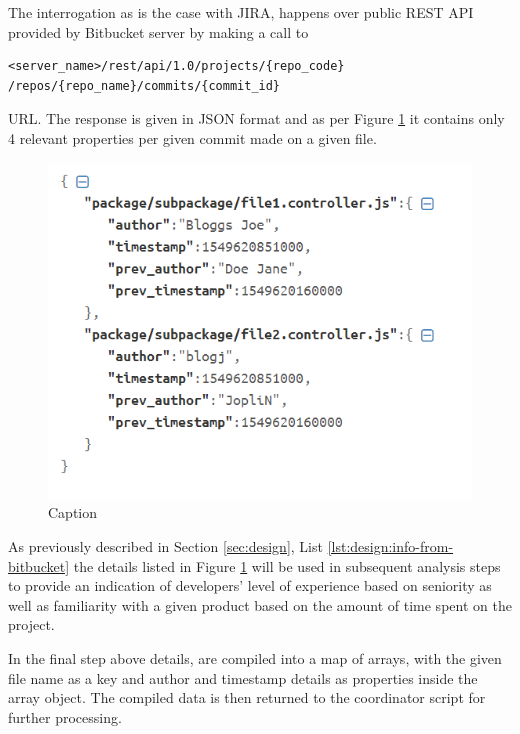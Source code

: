 The interrogation as is the case with JIRA, happens over public REST API provided by Bitbucket server by making a call to 
\begin{verbatim}
<server_name>/rest/api/1.0/projects/{repo_code} /repos/{repo_name}/commits/{commit_id}
\end{verbatim} 
URL.
The response is given in JSON format and as per Figure \ref{fig:source-code:bitbucket-prev-commit-response} it contains only 4 relevant properties per given commit made on a given file.

\begin{figure}[!h]
    \centering
    \includegraphics[scale=0.7]{Figures/gatherer/bitbucket_commit_details.PNG}
    \caption{Caption}
    \label{fig:source-code:bitbucket-prev-commit-response}
\end{figure}

As previously described in Section \ref{sec:design}, List \ref{lst:design:info-from-bitbucket} the details listed in Figure \ref{fig:source-code:bitbucket-prev-commit-response} will be used in subsequent analysis steps to provide an indication of developers' level of experience based on seniority as well as familiarity with a given product based on the amount of time spent on the project.
    
In the final step above details, are compiled into a map of arrays, with the given file name as a key and author and timestamp details as properties inside the array object. The compiled data is then returned to the coordinator script for further processing.
 
